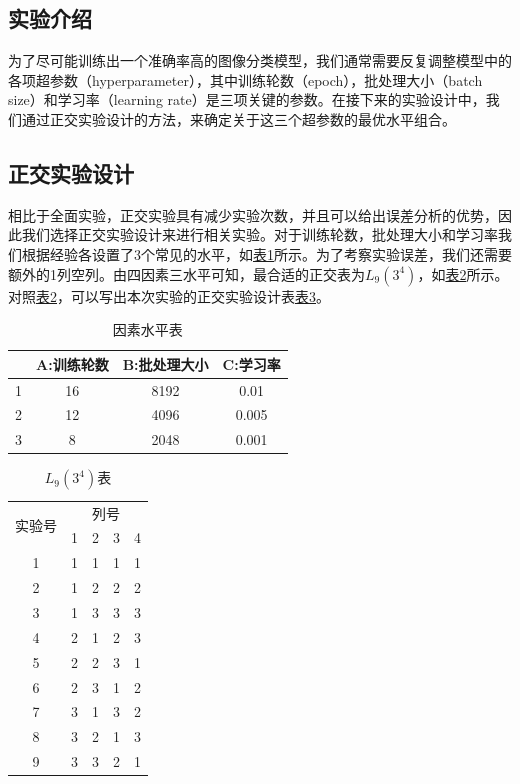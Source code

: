 \documentclass[UTF8]{ctexart}
\begin{document}
	\subsection{实验介绍}
	为了尽可能训练出一个准确率高的图像分类模型，我们通常需要反复调整模型中的各项超参数（hyperparameter），其中训练轮数（epoch），批处理大小（batch size）和学习率（learning rate）是三项关键的参数。在接下来的实验设计中，我们通过正交实验设计的方法，来确定关于这三个超参数的最优水平组合。
	
	\subsection{正交实验设计}
	相比于全面实验，正交实验具有减少实验次数，并且可以给出误差分析的优势，因此我们选择正交实验设计来进行相关实验。对于训练轮数，批处理大小和学习率我们根据经验各设置了3个常见的水平，如\hyperref[Chart.1]{表1}所示。为了考察实验误差，我们还需要额外的1列空列。由四因素三水平可知，最合适的正交表为$L_9(3^4)$，如\hyperref[Chart.2]{表2}所示。对照\hyperref[Chart.2]{表2}，可以写出本次实验的正交实验设计表\hyperref[Chart.2]{表3}。
	
		
	\begin{table}[htbp]  
		\centering
		\caption{因素水平表} 
		\begin{center}  
			\begin{tabular}{|c|c|c|c|}  
				\hline  
				\diagbox{水平}{因素} & A:训练轮数 & B:批处理大小 & C:学习率 \\ \hline  
				1 &  16 & 8192 & 0.01  \\ \hline  
				2 & 12 & 4096 & 0.005 \\  \hline  
				3 & 8 & 2048 & 0.001\\  \hline  
			\end{tabular}  
		\end{center}  
		\label{Chart.1}
	\end{table}
	

	\begin{table}[htbp]
		\centering
		\caption{$L_9(3^4)$表}
		\begin{tabular}{|c|c|c|c|c|}
			\hline
			\multirow{2}[4]{*}{实验号} & \multicolumn{4}{c|}{列号} \\
			\cline{2-5}      & 1 & 2 & 3 & 4 \\ \hline
			1 & 1 & 1 & 1 & 1 \\ \hline
			2 & 1 & 2 & 2 & 2 \\ \hline
			3 & 1 & 3 & 3 & 3 \\
			\hline
			4 & 2 & 1 & 2 & 3 \\
			\hline
			5 & 2 & 2 & 3 & 1 \\
			\hline
			6 & 2 & 3 & 1 & 2 \\
			\hline
			7 & 3 & 1 & 3 & 2 \\
			\hline
			8 & 3 & 2 & 1 & 3 \\
			\hline
			9 & 3 & 3 & 2 & 1 \\
			\hline
		\end{tabular}%
		\label{Chart.2}%
	\end{table}%
\end{document}
